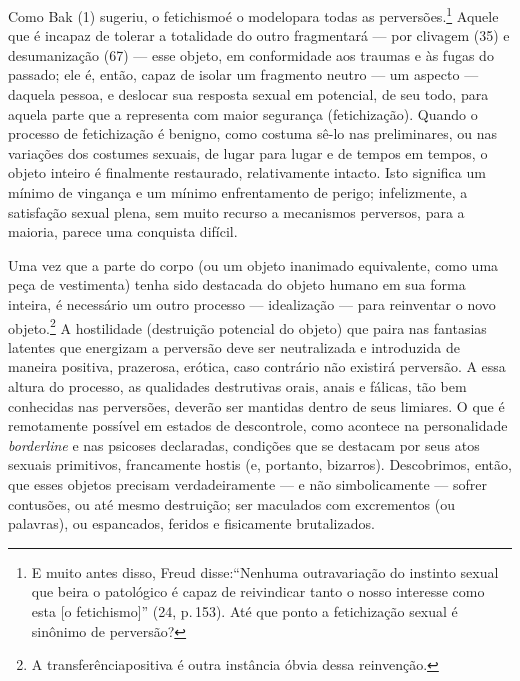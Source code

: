 Como Bak\idxbak{} (1) sugeriu, o fetichismo\idxfetic[|(] é o modelo\idxdesu[|(] para todas as
perversões.\footnote{ E muito antes disso, Freud disse:\idxfreudfetic[|nn]
``Nenhuma outra\idxdesfa[|(] variação do instinto sexual que beira o
patológico é capaz de reivindicar tanto o nosso interesse como esta [o
fetichismo]'' (24, p.\,153). Até que ponto a fetichização
sexual é sinônimo de perversão?} Aquele que é incapaz de tolerar a
totalidade do outro fragmentará --- por clivagem\idxcliv{} (35) e
desumanização (67) --- esse objeto, em conformidade aos traumas e às
fugas do passado; ele é, então, capaz de isolar um fragmento neutro
--- um aspecto --- daquela pessoa, e deslocar sua resposta sexual em
potencial, de seu todo, para aquela parte que a representa com maior
segurança (fetichização). Quando o processo de fetichização é benigno,
como costuma sê-lo nas preliminares, ou nas variações dos costumes
sexuais, de lugar para lugar e de tempos em tempos, o objeto inteiro é
finalmente restaurado, relativamente intacto. Isto significa um mínimo
de vingança e um mínimo enfrentamento de perigo; infelizmente, a
satisfação sexual plena, sem muito recurso a mecanismos perversos, para
a maioria, parece uma conquista difícil.

Uma vez que a parte do corpo (ou um objeto inanimado equivalente,
como uma peça de vestimenta)\idxfeminsimb{} tenha sido destacada do objeto humano em
sua forma inteira, é necessário um outro processo --- idealização ---\idxideal{}
para reinventar o novo objeto.\footnote{ A transferência\idxtransf[|nn] positiva é
outra instância óbvia dessa reinvenção.} A hostilidade (destruição
potencial do objeto) que paira nas fantasias latentes que energizam a
perversão deve ser neutralizada e introduzida de maneira positiva,
prazerosa, erótica, caso contrário não existirá perversão. A essa
altura do processo, as qualidades destrutivas orais, anais e fálicas,
tão bem conhecidas nas perversões, deverão ser mantidas dentro de seus
limiares. O que é remotamente possível em estados de descontrole, como
acontece na personalidade \textit{borderline} e nas psicoses\idxpsico{}
declaradas, condições que se destacam por seus atos sexuais primitivos,
francamente hostis (e, portanto, bizarros). Descobrimos, então, que
esses objetos precisam verdadeiramente --- e não simbolicamente ---
sofrer contusões, ou até mesmo destruição; ser maculados com
excrementos (ou palavras), ou espancados, feridos e fisicamente
brutalizados.

